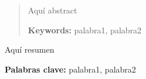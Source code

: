 \begin{abstract}

Aquí abstract
\bigskip

\textbf{Keywords:} palabra1, palabra2


\end{abstract}
\begin{resumen}

Aquí resumen
\bigskip

\textbf{Palabras clave:} palabra1, palabra2

\end{resumen}
